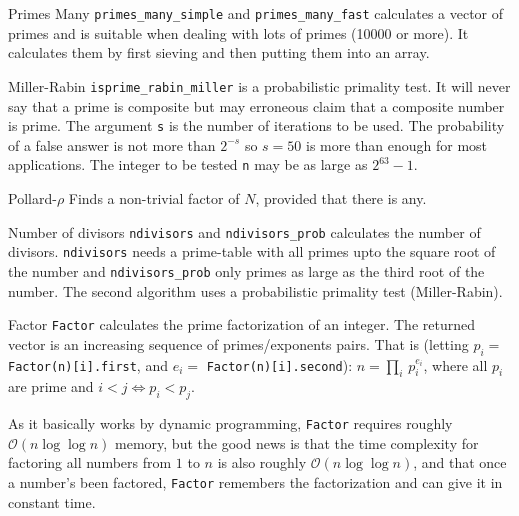 \begin{algorithm}{Primes Many}
\desc
{\tt primes\_many\_simple} and {\tt primes\_many\_fast}
calculates a vector of primes and is suitable when dealing with lots of
primes (10000 or more). It calculates them by first sieving and then
putting them into an array.
\end{algorithm}

\begin{algorithm}{Miller-Rabin}
\desc
{\tt isprime\_rabin\_miller} is a probabilistic primality
test. It will never say that a prime is composite but may erroneous claim
that a composite number is prime. The argument {\tt s} is the number of
iterations to be used. The probability of a false answer is not more than
$2^{-s}$ so $s=50$ is more than enough for most applications. The integer
to be tested {\tt n} may be as large as $2^{63}-1$.
\end{algorithm}

\begin{algorithm}{Pollard-$\rho$}
\desc
Finds a non-trivial factor of $N$, provided that there is any.
\end{algorithm}

\begin{algorithm}{Number of divisors}
\desc
{\tt ndivisors} and {\tt ndivisors\_prob} calculates
the number of divisors. {\tt ndivisors} needs a prime-table with all primes
upto the square root of the number and {\tt ndivisors\_prob} only primes as
large as the third root of the number. The second algorithm uses a
probabilistic primality test (Miller-Rabin).
\end{algorithm}

\begin{algorithm}{Factor}
\desc
{\tt Factor} calculates the prime factorization of an integer.
The returned vector is an increasing sequence of primes/exponents pairs.
That is (letting $p_i = $ {\tt Factor(n)[i].first}, and $e_i = $
{\tt Factor(n)[i].second}): $n = \prod_i \, p_i^{e_i}$, where all $p_i$ are
prime and $i < j \Leftrightarrow p_i < p_j$.

As it basically works by dynamic programming, {\tt Factor} requires
roughly $\mathcal{O}(n \log \log n)$ memory, but the good news is that
the time complexity for factoring all numbers from $1$ to $n$ is also
roughly $\mathcal{O}(n \log \log n)$, and that once a number's been
factored, {\tt Factor} remembers the factorization and can give it in
constant time.
\end{algorithm}

